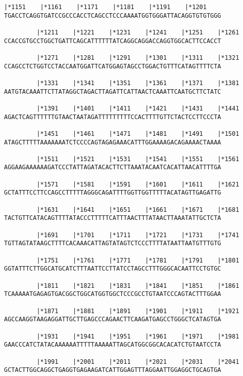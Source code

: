 \documentclass{article}
\begin{document}
\newpage
\begin{Verbatim}[fontfamily=courier]
         |*1151    |*1161    |*1171    |*1181    |*1191    |*1201
TGACCTCAGGTGATCCGCCCACCTCAGCCTCCCAAAATGGTGGGATTACAGGTGTGTGGG

         |*1211    |*1221    |*1231    |*1241    |*1251    |*1261
CCACCGTGCCTGGCTGATTCAGCATTTTTTATCAGGCAGGACCAGGTGGCACTTCCACCT

         |*1271    |*1281    |*1291    |*1301    |*1311    |*1321
CCAGCCTCTGGTCCTACCAATGGATTCATGGAGTAGCCTGGACTGTTTCATAGTTTTCTA

         |*1331    |*1341    |*1351    |*1361    |*1371    |*1381
AATGTACAAATTCTTATAGGCTAGACTTAGATTCATTAACTCAAATTCAATGCTTCTATC

         |*1391    |*1401    |*1411    |*1421    |*1431    |*1441
AGACTCAGTTTTTTGTAACTAATAGATTTTTTTTTCCACTTTTGTTCTACTCCTTCCCTA

         |*1451    |*1461    |*1471    |*1481    |*1491    |*1501
ATAGCTTTTTAAAAAAATCTCCCCAGTAGAGAAACATTTGGAAAAGACAGAAAACTAAAA

         |*1511    |*1521    |*1531    |*1541    |*1551    |*1561
AGGAAGAAAAAAGATCCCTATTAGATACACTTCTTAAATACAATCACATTAACATTTTGA

         |*1571    |*1581    |*1591    |*1601    |*1611    |*1621
GCTATTTCCTTCCAGCCTTTTTAGGGCAGATTTTGGTTGGTTTTTACATAGTTGAGATTG

         |*1631    |*1641    |*1651    |*1661    |*1671    |*1681
TACTGTTCATACAGTTTTATACCCTTTTTCATTTAACTTTATAACTTAAATATTGCTCTA

         |*1691    |*1701    |*1711    |*1721    |*1731    |*1741
TGTTAGTATAAGCTTTTCACAAACATTAGTATAGTCTCCCTTTTATAATTAATGTTTGTG

         |*1751    |*1761    |*1771    |*1781    |*1791    |*1801
GGTATTTCTTGGCATGCATCTTTAATTCCTTATCCTAGCCTTTGGGCACAATTCCTGTGC

         |*1811    |*1821    |*1831    |*1841    |*1851    |*1861
TCAAAAATGAGAGTGACGGCTGGCATGGTGGCTCCCGCCTGTAATCCCAGTACTTTGGAA

         |*1871    |*1881    |*1891    |*1901    |*1911    |*1921
AGCCAAGGTAAGAGGATTGCTTGAGCCCAGAACTTCAAGATGAGCCTGGGCTCATAGTGA

         |*1931    |*1941    |*1951    |*1961    |*1971    |*1981
GAACCCATCTATACAAAAAATTTTTAAAAATTAGCATGGCGGCACACATCTGTAATCCTA

         |*1991    |*2001    |*2011    |*2021    |*2031    |*2041
GCTACTTGGCAGGCTGAGGTGAGAAGATCATTGGAGTTTAGGAATTGGAGGCTGCAGTGA

\end{Verbatim}
\end{document}
